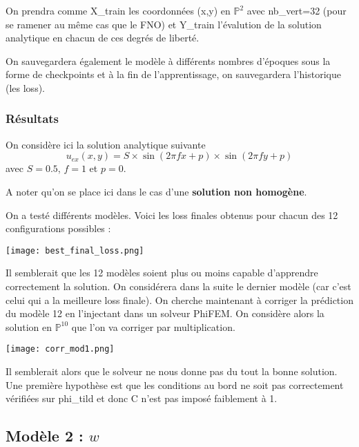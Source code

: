 \begin{Rem}
	On prendra comme X\_train les coordonnées (x,y) en $\mathbb{P}^2$ avec nb\_vert=32 (pour se ramener au même cas que le FNO) et Y\_train l'évalution de la solution analytique en chacun de ces degrés de liberté.
	
	On sauvegardera également le modèle à différents nombres d'époques sous la forme de checkpoints et à la fin de l'apprentissage, on sauvegardera l'historique (les loss).
\end{Rem}

\subsubsection{Résultats}

On considère ici la solution analytique suivante
$$u_{ex}(x,y)=S\times\sin(2\pi fx+p)\times\sin(2\pi fy+p)$$
avec $S=0.5$, $f=1$ et $p=0$.

\begin{Rem}
	A noter qu'on se place ici dans le cas d'une \textbf{solution non homogène}.
\end{Rem}

On a testé différents modèles. Voici les loss finales obtenus pour chacun des 12 configurations possibles :

\begin{minipage}{\linewidth}
	\centering
	\texttt{[image: best\_final\_loss.png]}
\end{minipage}

Il semblerait que les 12 modèles soient plus ou moins capable d'apprendre correctement la solution. On considérera dans la suite le dernier modèle (car c'est celui qui a la meilleure loss finale). On cherche maintenant à corriger la prédiction du modèle 12 en l'injectant dans un solveur PhiFEM. On considère alors la solution en $\mathbb{P}^{10}$ que l'on va corriger par multiplication.

\begin{minipage}{\linewidth}
	\centering
	\texttt{[image: corr\_mod1.png]}
\end{minipage}

Il semblerait alors que le solveur ne nous donne pas du tout la bonne solution. Une première hypothèse est que les conditions au bord ne soit pas correctement vérifiées sur phi\_tild et donc C n'est pas imposé faiblement à 1.  

\newpage

\subsection{Modèle 2 : $w$}

